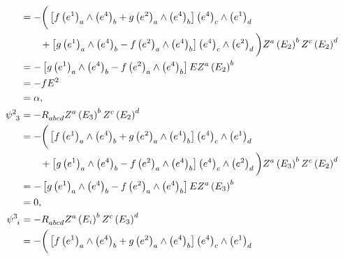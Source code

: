 \begin{xiti}
\begin{zm}
\begin{align*}
			&= - \bigg( \left[ f \tensor{\left( e^1 \right)}{_a} \wedge \tensor{\left( e^4 \right)}{_b} + g \tensor{\left( e^2 \right)}{_a} \wedge \tensor{\left( e^4 \right)}{_b} \right] \tensor{\left( e^4 \right)}{_c} \wedge \tensor{\left( e^1 \right)}{_d}\\
			&\qquad {}+ \left[ g \tensor{\left( e^1 \right)}{_a} \wedge \tensor{\left( e^4 \right)}{_b} - f \tensor{\left( e^2 \right)}{_a} \wedge \tensor{\left( e^4 \right)}{_b} \right] \tensor{\left( e^4 \right)}{_c} \wedge \tensor{\left( e^2 \right)}{_d} \bigg) \tensor{Z}{^a} \tensor{\left( E_2 \right)}{^b} \tensor{Z}{^c} \tensor{\left( E_2 \right)}{^d}\\
			&= - \left[ g \tensor{\left( e^1 \right)}{_a} \wedge \tensor{\left( e^4 \right)}{_b} - f \tensor{\left( e^2 \right)}{_a} \wedge \tensor{\left( e^4 \right)}{_b} \right] E \tensor{Z}{^a} \tensor{\left( E_2 \right)}{^b}\\
			&= - f E^2\\
			&= \alpha,\\
			\tensor{\psi}{^2_3} &= - \tensor{R}{_a_b_c_d} \tensor{Z}{^a} \tensor{\left( E_3 \right)}{^b} \tensor{Z}{^c} \tensor{\left( E_2 \right)}{^d}\\
			&= - \bigg( \left[ f \tensor{\left( e^1 \right)}{_a} \wedge \tensor{\left( e^4 \right)}{_b} + g \tensor{\left( e^2 \right)}{_a} \wedge \tensor{\left( e^4 \right)}{_b} \right] \tensor{\left( e^4 \right)}{_c} \wedge \tensor{\left( e^1 \right)}{_d}\\
			&\qquad {}+ \left[ g \tensor{\left( e^1 \right)}{_a} \wedge \tensor{\left( e^4 \right)}{_b} - f \tensor{\left( e^2 \right)}{_a} \wedge \tensor{\left( e^4 \right)}{_b} \right] \tensor{\left( e^4 \right)}{_c} \wedge \tensor{\left( e^2 \right)}{_d} \bigg) \tensor{Z}{^a} \tensor{\left( E_3 \right)}{^b} \tensor{Z}{^c} \tensor{\left( E_2 \right)}{^d}\\
			&= - \left[ g \tensor{\left( e^1 \right)}{_a} \wedge \tensor{\left( e^4 \right)}{_b} - f \tensor{\left( e^2 \right)}{_a} \wedge \tensor{\left( e^4 \right)}{_b} \right] E \tensor{Z}{^a} \tensor{\left( E_3 \right)}{^b}\\
			&= 0,\\
			\tensor{\psi}{^3_i} &= - \tensor{R}{_a_b_c_d} \tensor{Z}{^a} \tensor{\left( E_i \right)}{^b} \tensor{Z}{^c} \tensor{\left( E_3 \right)}{^d}\\
			&= - \bigg( \left[ f \tensor{\left( e^1 \right)}{_a} \wedge \tensor{\left( e^4 \right)}{_b} + g \tensor{\left( e^2 \right)}{_a} \wedge \tensor{\left( e^4 \right)}{_b} \right] \tensor{\left( e^4 \right)}{_c} \wedge \tensor{\left( e^1 \right)}{_d}\\

\end{align*}
\end{zm}
\end{xiti}
